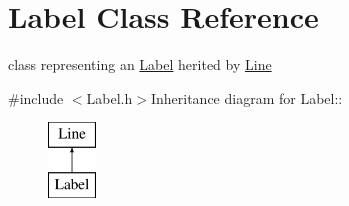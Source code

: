 \hypertarget{classLabel}{
\section{Label Class Reference}
\label{classLabel}
}


class representing an \hyperlink{classLabel}{Label} herited by \hyperlink{classLine}{Line}  


{\ttfamily \#include $<$Label.h$>$}Inheritance diagram for Label::\begin{figure}[H]
\begin{center}
\leavevmode
\includegraphics[height=2cm]{classLabel}
\end{center}
\end{figure}
